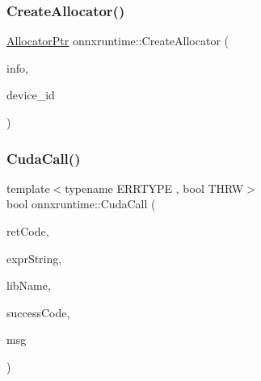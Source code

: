 \mbox{\label{namespaceonnxruntime_ab043113cd835e58659310492a0d5bcec}} 
\subsubsection{\texorpdfstring{Create\+Allocator()}{CreateAllocator()}}
{\footnotesize\ttfamily \mbox{\hyperlink{namespaceonnxruntime_a6cdac724c5dcefded3a63f08dae58fda}{Allocator\+Ptr}} onnxruntime\+::\+Create\+Allocator (\begin{DoxyParamCaption}\item[{\mbox{\hyperlink{structonnxruntime_1_1DeviceAllocatorRegistrationInfo}{Device\+Allocator\+Registration\+Info}}}]{info,  }\item[{int}]{device\+\_\+id }\end{DoxyParamCaption})}

\mbox{\label{namespaceonnxruntime_a4bcb94c50ee1b7834c90f0c6334986e0}} 
\subsubsection{\texorpdfstring{Cuda\+Call()}{CudaCall()}}
{\footnotesize\ttfamily template$<$typename E\+R\+R\+T\+Y\+PE , bool T\+H\+RW$>$ \\
bool onnxruntime\+::\+Cuda\+Call (\begin{DoxyParamCaption}\item[{E\+R\+R\+T\+Y\+PE}]{ret\+Code,  }\item[{const char $\ast$}]{expr\+String,  }\item[{const char $\ast$}]{lib\+Name,  }\item[{E\+R\+R\+T\+Y\+PE}]{success\+Code,  }\item[{const char $\ast$}]{msg }\end{DoxyParamCaption})}

\mbox{\label{namespaceonnxruntime_aba67f313705ae0ba915eb100d23641de}} 
